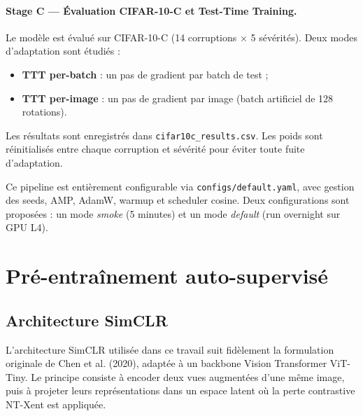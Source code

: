 \documentclass[12pt,a4paper]{report}
\begin{document}
	\paragraph{Stage C — Évaluation CIFAR-10-C et Test-Time Training.}
	Le modèle est évalué sur CIFAR-10-C (14 corruptions × 5 sévérités).  
	Deux modes d’adaptation sont étudiés :
	\begin{itemize}
		\item \textbf{TTT per-batch} : un pas de gradient par batch de test ;
		\item \textbf{TTT per-image} : un pas de gradient par image (batch artificiel de 128 rotations).
	\end{itemize}
	Les résultats sont enregistrés dans \texttt{cifar10c\_results.csv}.  
	Les poids sont réinitialisés entre chaque corruption et sévérité pour éviter toute fuite d’adaptation.
	
	\medskip
	
	Ce pipeline est entièrement configurable via \texttt{configs/default.yaml}, avec gestion des seeds, AMP, AdamW, warmup et scheduler cosine.  
	Deux configurations sont proposées : un mode \emph{smoke} (5 minutes) et un mode \emph{default} (run overnight sur GPU L4).
	
	
	\section{Pré-entraînement auto-supervisé}
	
	\subsection{Architecture SimCLR}
	
	L’architecture SimCLR utilisée dans ce travail suit fidèlement la formulation originale de Chen et al. (2020), adaptée à un backbone Vision Transformer ViT-Tiny. 
	Le principe consiste à encoder deux vues augmentées d’une même image, puis à projeter leurs représentations dans un espace latent où la perte contrastive NT-Xent est appliquée.
	
\end{document}
